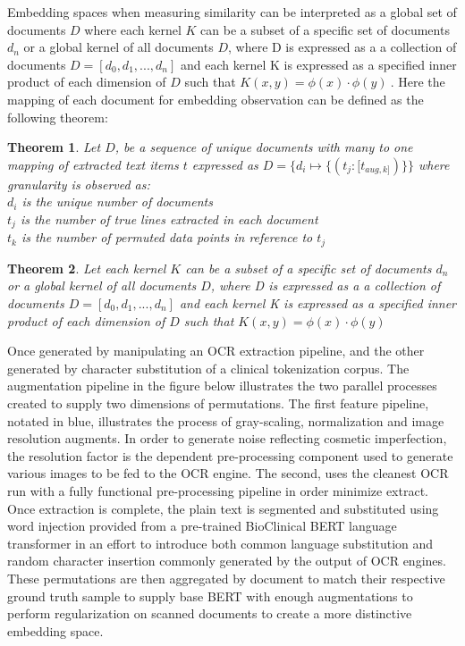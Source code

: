 \documentclass{article}
\newtheorem{theorem}{Theorem}
\begin{document}
 
 Embedding spaces when measuring similarity can be interpreted as a global set of documents $D$ where each kernel $K$ can be a subset of a specific set of documents $d_n$ or a global kernel of all documents $D$, where D is expressed as a a collection of documents $D=[d_{0}, d_{1}, ...,d_{n}]$ and each kernel K is expressed as a specified inner product of each dimension of  $D$ such that $K(x,y)=\phi(x)\cdot \phi(y)\ {}$. Here the mapping of each document for embedding observation can be defined as the following theorem:

\begin{theorem}
Let \(D\), be a sequence of unique documents with many to one mapping of extracted text items \(t\) expressed as $D=\{d_i \mapsto \{(t_j:[t_{aug,k]})\}\}$
where granularity is observed as: \\ 
$d_i$ is the unique number of documents \\
$t_j$ is the number of true lines extracted in each document \\ 
$t_k$ is the number of permuted data points in reference to $t_j$ \\ 
\end{theorem}


\begin{theorem}
Let each kernel $K$ can be a subset of a specific set of documents $d_n$ or a global kernel of all documents $D$, where D is expressed as a a collection of documents $D=[d_{0}, d_{1}, ...,d_{n}]$ and each kernel K is expressed as a specified inner product of each dimension of  $D$ such that $K(x,y)=\phi(x)\cdot \phi(y)\ {}$ \\ 
\end{theorem}

Once generated by manipulating an OCR extraction pipeline, and the other generated by character substitution of a clinical tokenization corpus. The augmentation pipeline in the figure below illustrates the two parallel processes created to supply two dimensions of permutations. The first feature pipeline, notated in blue, illustrates the process of gray-scaling, normalization and image resolution augments. In order to generate noise reflecting cosmetic imperfection, the resolution factor is the dependent pre-processing component used to generate various images to be fed to the OCR engine. The second, uses the cleanest OCR run with a fully functional pre-processing pipeline in order minimize extract. Once extraction is complete, the plain text is segmented and substituted using word injection provided from a pre-trained BioClinical BERT language transformer in an effort to introduce both common language substitution and random character insertion commonly generated by the output of OCR engines. These permutations are then aggregated by document to match their respective ground truth sample to supply base BERT with enough augmentations to perform regularization on scanned documents to create a more distinctive embedding space.
\end{document}
